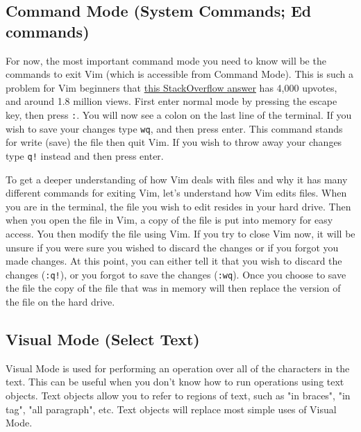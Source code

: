 \documentclass[11pt]{article}
\begin{document}
\subsection{Command Mode (System Commands; Ed commands)}
\label{sec:org038b4cc}
For now, the most important command mode you need to know will be the commands
to exit Vim (which is accessible from Command Mode). This is such a problem for
Vim beginners that \href{https://stackoverflow.com/questions/11828270/how-to-exit-the-vim-editor}{this StackOverflow answer} has 4,000 upvotes, and around 1.8
million views. First enter normal mode by pressing the escape key, then press
\texttt{:}. You will now see a colon on the last line of the terminal. If you wish to
save your changes type \texttt{wq}, and then press enter. This command stands for write
(save) the file then quit Vim. If you wish to throw away your changes type \texttt{q!}
instead and then press enter.

To get a deeper understanding of how Vim deals with files and why it has many
different commands for exiting Vim, let's understand how Vim edits files. When
you are in the terminal, the file you wish to edit resides in your hard drive.
Then when you open the file in Vim, a copy of the file is put into memory for
easy access. You then modify the file using Vim. If you try to close Vim now, it
will be unsure if you were sure you wished to discard the changes or if you
forgot you made changes. At this point, you can either tell it that you wish to
discard the changes (\texttt{:q!}), or you forgot to save the changes (\texttt{:wq}). Once you
choose to save the file the copy of the file that was in memory will then
replace the version of the file on the hard drive.
\subsection{Visual Mode (Select Text)}
\label{sec:org5c03edb}
Visual Mode is used for performing an operation over all of the characters in
the text. This can be useful when you don't know how to run operations using
text objects. Text objects allow you to refer to regions of text, such as "in
braces", "in tag", "all paragraph", etc. Text objects will replace most simple
uses of Visual Mode.
\end{document}

